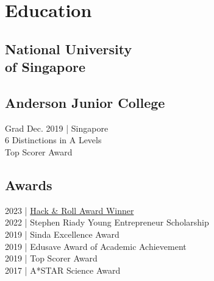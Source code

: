 \documentclass[]{cv}
\begin{document}
%
%
\lastupdated

%
%

%
%

\begin{minipage}[t]{0.33\textwidth} 


\section{Education} 

\subsection{National University \\ of Singapore}
\subtitle{University Scholars Programme}
\subtitle{NUS College Honours Programme}
\subtitle{Stephen Riady Young Entrepreneur Scholar}
\sectionsep

\subsection{Anderson Junior College}
Grad Dec. 2019 | Singapore\\
6 Distinctions in A Levels\\
Top Scorer Award
\sectionsep

\subsection{Awards}
2023 | \href{https://github.com/g-tejas/Changuage}{Hack \& Roll Award Winner}\\
2022 | Stephen Riady Young Entrepreneur Scholarship\\
2019 | Sinda Excellence Award\\
2019 | Edusave Award of Academic Achievement\\
2019 | Top Scorer Award\\
2017 | A*STAR Science Award
\sectionsep


\end{minipage}
\end{document}
